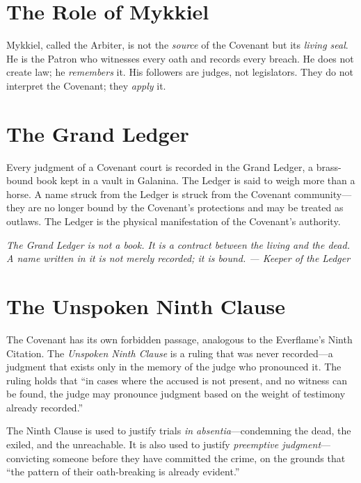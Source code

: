 \documentclass{book}
\newcommand{\citation}[1]{\textcolor{marginalia}{\small\textit{#1}}}
\begin{document}

\section{The Role of Mykkiel}

Mykkiel, called the Arbiter, is not the \textit{source} of the Covenant but its \textit{living seal}. He is the Patron who witnesses every oath and records every breach. He does not create law; he \textit{remembers} it. His followers are judges, not legislators. They do not interpret the Covenant; they \textit{apply} it.

\section{The Grand Ledger}

Every judgment of a Covenant court is recorded in the Grand Ledger, a brass-bound book kept in a vault in Galanina. The Ledger is said to weigh more than a horse. A name struck from the Ledger is struck from the Covenant community---they are no longer bound by the Covenant's protections and may be treated as outlaws. The Ledger is the physical manifestation of the Covenant's authority.

\citation{The Grand Ledger is not a book. It is a contract between the living and the dead. A name written in it is not merely recorded; it is \textit{bound}. --- Keeper of the Ledger}

\section{The Unspoken Ninth Clause}

The Covenant has its own forbidden passage, analogous to the Everflame's Ninth Citation. The \textit{Unspoken Ninth Clause} is a ruling that was never recorded---a judgment that exists only in the memory of the judge who pronounced it. The ruling holds that ``in cases where the accused is not present, and no witness can be found, the judge may pronounce judgment based on the weight of testimony already recorded.''

The Ninth Clause is used to justify trials \textit{in absentia}---condemning the dead, the exiled, and the unreachable. It is also used to justify \textit{preemptive judgment}---convicting someone before they have committed the crime, on the grounds that ``the pattern of their oath-breaking is already evident.''
\end{document}
